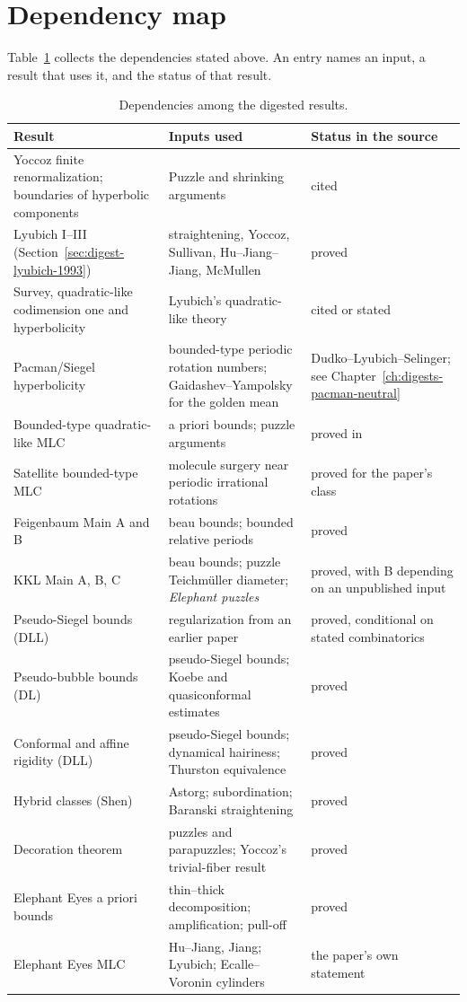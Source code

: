 \section{Dependency map}
\label{sec:digests-dependencies}

Table~\ref{tab:digest-dependencies} collects the dependencies stated above.  An
entry names an input, a result that uses it, and the status of that result.

\begin{table}[ht]
\centering\small
\begin{tabularx}{\textwidth}{@{}>{\raggedright\arraybackslash}p{}>{\raggedright\arraybackslash}X>{\raggedright\arraybackslash}p{}@{}}
\textbf{Result} & \textbf{Inputs used} & \textbf{Status in the source}\\
\hline
Yoccoz finite renormalization; boundaries of hyperbolic components &
Puzzle and shrinking arguments &
cited\\
Lyubich I--III (Section~\ref{sec:digest-lyubich-1993}) &
straightening, Yoccoz, Sullivan, Hu--Jiang--Jiang, McMullen &
proved\\
Survey, quadratic-like codimension one and hyperbolicity &
Lyubich's quadratic-like theory &
cited or stated\\
Pacman/Siegel hyperbolicity &
bounded-type periodic rotation numbers; Gaidashev--Yampolsky for the golden mean &
Dudko--Lyubich--Selinger; see Chapter~\ref{ch:digests-pacman-neutral}\\
Bounded-type quadratic-like MLC &
a priori bounds; puzzle arguments &
proved in~\cite{DudkoLyubichFeigenbaum}\\
Satellite bounded-type MLC &
molecule surgery near periodic irrational rotations &
proved for the paper's class\\
Feigenbaum Main A and B &
beau bounds; bounded relative periods &
proved\\
KKL Main A, B, C &
beau bounds; puzzle Teichm\"uller diameter; \emph{Elephant puzzles} &
proved, with B depending on an unpublished input\\
Pseudo-Siegel bounds (DLL) &
regularization from an earlier paper &
proved, conditional on stated combinatorics\\
Pseudo-bubble bounds (DL) &
pseudo-Siegel bounds; Koebe and quasiconformal estimates &
proved\\
Conformal and affine rigidity (DLL) &
pseudo-Siegel bounds; dynamical hairiness; Thurston equivalence &
proved\\
Hybrid classes (Shen) &
Astorg; subordination; Baranski straightening &
proved\\
Decoration theorem &
puzzles and parapuzzles; Yoccoz's trivial-fiber result &
proved\\
Elephant Eyes a priori bounds &
thin--thick decomposition; amplification; pull-off &
proved\\
Elephant Eyes MLC &
Hu--Jiang, Jiang; Lyubich; Ecalle--Voronin cylinders &
the paper's own statement\\
\end{tabularx}
\caption{Dependencies among the digested results.}
\label{tab:digest-dependencies}
\end{table}


